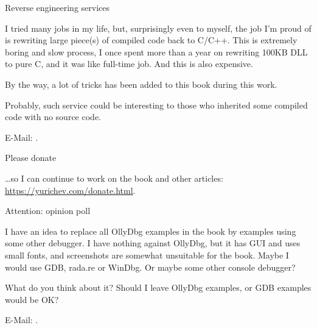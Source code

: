 \vspace*{\fill}

\huge Reverse engineering services
\normalsize

\bigskip
\bigskip
\bigskip

I tried many jobs in my life, but, surprisingly even to myself,
the job I'm proud of is rewriting large piece(s) of compiled code back to C/C++.
This is extremely boring and slow process, I once spent more than a year on rewriting 100KB DLL to pure C,
and it was like full-time job.
And this is also expensive.

By the way, a lot of tricks has been added to this book during this work.

Probably, such service could be interesting to those who inherited some compiled code with no source code.

E-Mail: \GTT{\EMAIL}.

\bigskip
\bigskip
\bigskip

\huge Please donate
\normalsize

\bigskip
\bigskip
\bigskip

\dots so I can continue to work on the book and other articles: \\
\url{https://yurichev.com/donate.html}.

\bigskip
\bigskip
\bigskip

\huge Attention: opinion poll
\normalsize

\bigskip
\bigskip
\bigskip

I have an idea to replace all OllyDbg examples in the book by examples using some other debugger.
I have nothing against OllyDbg, but it has GUI and uses small fonts, and screenshots are somewhat unsuitable for the book.
Maybe I would use GDB, rada.re or WinDbg.
Or maybe some other console debugger?

What do you think about it?
Should I leave OllyDbg examples, or GDB examples would be OK?

E-Mail: \GTT{\EMAIL}.

\vspace*{\fill}
\vfill
